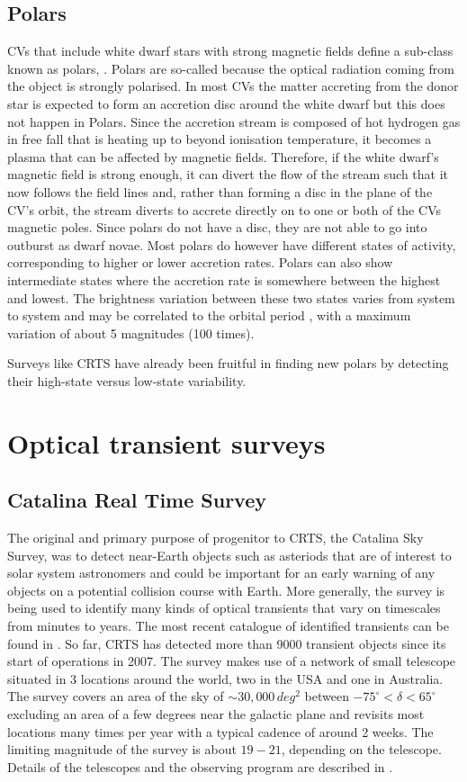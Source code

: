 \documentclass[a4paper,fleqn,usenatbib]{mnras}
\begin{document}
\subsection{Polars}
CVs that include white dwarf stars with strong magnetic fields define a sub-class known as polars, \citep{CropperReview}. Polars are so-called because the optical radiation coming from the object is strongly polarised. In most CVs the matter accreting from the donor star is expected to form an accretion disc around the white dwarf but this does not happen in Polars. Since the accretion stream is composed of hot hydrogen gas in free fall that is heating up to beyond ionisation temperature, it becomes a plasma that can be affected by magnetic fields. Therefore, if the white dwarf's magnetic field is strong enough, it can divert the flow of the stream such that it now follows the field lines and, rather than forming a disc in the plane of the CV's orbit, the stream diverts to accrete directly on to one or both of the CVs magnetic poles. Since polars do not have a disc, they are not able to go into outburst as dwarf novae. Most polars do however have different states of activity, corresponding to higher or lower accretion rates. Polars can also show intermediate states where the accretion rate is somewhere between the highest and lowest. The brightness variation between these two states varies from system to system and may be correlated to the orbital period \citep{WarnerBook}, with a maximum variation of about 5 magnitudes (100 times).

Surveys like CRTS have already been fruitful in finding new polars by detecting their high-state versus low-state variability. 

\section{Optical transient surveys}

\subsection{Catalina Real Time Survey}
The original and primary purpose of progenitor to CRTS, the Catalina Sky Survey, was to detect near-Earth objects such as asteriods that are of interest to solar system astronomers and could be important for an early warning of any objects on a potential collision course with Earth. More generally, the survey is being used to identify many kinds of optical transients that vary on timescales from minutes to years. The most recent catalogue of identified transients can be found in \citet{CatalinaCatalog}. So far, CRTS has detected more than 9000 transient objects since its start of operations in 2007. The survey makes use of a network of  small telescope situated in 3 locations around the world, two in the USA and one in Australia. The survey covers an area of the sky of $\sim 30,000\,deg^2$ between $-75^\circ < \delta < 65^\circ$ excluding an area of a few degrees near the galactic plane and revisits most locations many times per year with a typical cadence of around 2 weeks. The limiting magnitude of the survey is about $19-21$, depending on the telescope. Details of the telescopes and the observing program are described in \citet{Drake2009}. 
\end{document}
